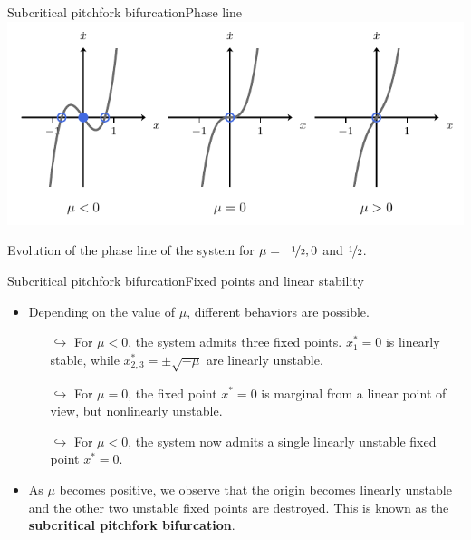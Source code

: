 \documentclass[usenames,dvipsnames,svgnames,10pt,aspectratio=169]{beamer}
\begin{document}
\begin{frame}[t, c]{Subcritical pitchfork bifurcation}{Phase line}
	\centering
	\includegraphics[width=.75\textwidth]{subcritical_pitchfork_phase_line}

	Evolution of the phase line of the system for $\mu = \nicefrac{-1}{2}, 0$ and $\nicefrac{1}{2}$.

	\vspace{1cm}
\end{frame}

\begin{frame}[t, c]{Subcritical pitchfork bifurcation}{Fixed points and linear stability}
	\begin{itemize}
		\item Depending on the value of $\mu$, different behaviors are possible.
		\begin{itemize}
			\item[$\hookrightarrow$] For $\mu < 0$, the system admits three fixed points. $x_1^*=0$ is linearly stable, while $x^*_{2, 3} = \pm \sqrt{-\mu}$ are linearly unstable.
			\item[$\hookrightarrow$] For $\mu = 0$, the fixed point $x^*=0$ is marginal from a linear point of view, but nonlinearly unstable.
			\item[$\hookrightarrow$] For $\mu<0$, the system now admits a single linearly unstable fixed point $x^* = 0$.
		\end{itemize}

		\medskip

		\item As $\mu$ becomes positive, we observe that the origin becomes linearly unstable and the other two unstable fixed points are destroyed. This is known as the \alert{\textbf{subcritical pitchfork bifurcation}}.
	\end{itemize}

	\vspace{1cm}
\end{frame}
\end{document}

